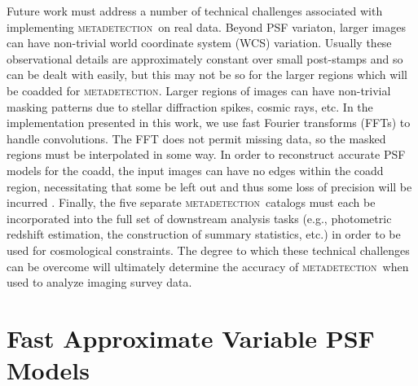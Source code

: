 \documentclass[fleqn,useAMS,usenatbib]{mnras}
\newcommand{\mdet}{\textsc{metadetection}}
\begin{document}
Future work must address a number of technical challenges associated with
implementing \mdet\ on real data. Beyond PSF variaton, larger images can have
non-trivial world coordinate system (WCS) variation.  Usually these
observational details are approximately constant over small post-stamps and so
can be dealt with easily, but this may not be so for the larger regions which
will be coadded for \mdet. Larger regions of images can have non-trivial
masking patterns due to stellar diffraction spikes, cosmic rays, etc. In the
implementation presented in this work, we use fast Fourier transforms (FFTs) to
handle convolutions. The FFT does not permit missing data, so the masked
regions must be interpolated in some way.  In order to reconstruct accurate PSF
models for the coadd, the input images can have no edges within the coadd
region, necessitating that some be left out and thus some loss of precision
will be incurred \citep{ArmstrongCoadd}.  Finally, the five separate \mdet\
catalogs must each be incorporated into the full set of downstream analysis
tasks (e.g., photometric redshift estimation, the construction of summary
statistics, etc.) in order to be used for cosmological constraints. The degree
to which these technical challenges can be overcome will ultimately determine
the accuracy of \mdet\ when used to analyze imaging survey data.




\appendix

\section{Fast Approximate Variable PSF Models}\label{app:pspsf}
\end{document}
